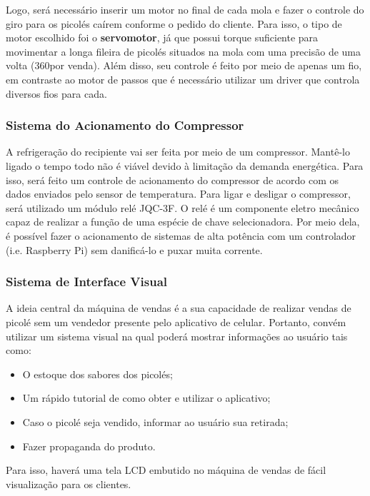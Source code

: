Logo, será necessário inserir um motor no final de cada mola e fazer o controle do giro para os picolés caírem conforme o pedido do cliente. Para isso, o tipo de motor escolhido foi o \textbf{servomotor}, já que possui torque suficiente para movimentar a longa fileira de picolés situados na mola com uma precisão de uma volta (360\degree por venda). Além disso, seu controle é feito por meio de apenas um fio, em contraste ao motor de passos que é necessário utilizar um driver que controla diversos fios para cada.

\subsubsection{Sistema do Acionamento do Compressor}

A refrigeração do recipiente vai ser feita por meio de um compressor. Mantê-lo ligado o tempo todo não é viável devido à limitação da demanda energética. Para isso, será feito um controle de acionamento do compressor de acordo com os dados enviados pelo sensor de temperatura. Para ligar e desligar o compressor, será utilizado um módulo relé JQC-3F. O relé é um componente eletro mecânico capaz de realizar a função de uma espécie de chave selecionadora. Por meio dela, é possível fazer o acionamento de sistemas de alta potência com um controlador (i.e. Raspberry Pi) sem danificá-lo e puxar muita corrente.

\subsubsection{Sistema de Interface Visual}

A ideia central da máquina de vendas é a sua capacidade de realizar vendas de picolé sem um vendedor presente pelo aplicativo de celular. Portanto, convém utilizar um sistema visual na qual poderá mostrar informações ao usuário tais como:

\begin{itemize}
  \item O estoque dos sabores dos picolés;
  \item Um rápido tutorial de como obter e utilizar o aplicativo;
  \item Caso o picolé seja vendido, informar ao usuário sua retirada;
  \item Fazer propaganda do produto.
\end{itemize}

Para isso, haverá uma tela LCD embutido no máquina de vendas de fácil visualização para os clientes.

